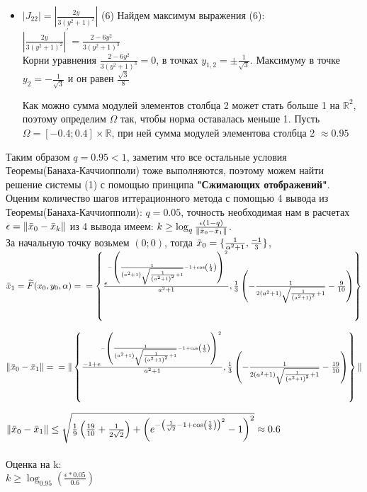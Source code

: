 \documentclass[a4paper, fontsize=14pt]{article}
\begin{document}
\begin{itemize}
        \item $|J_{22}| = |\frac{2 y}{3 \left(y^2+1\right)^2}|$ (6)
	Найдем максимум выражения (6):
	\\$|\frac{2 y}{3 \left(y^2+1\right)^2}|^\prime = \frac{2-6 y^2}{3 \left(y^2+1\right)^3}$
	\\Корни уравнения $\frac{2-6 y^2}{3 \left(y^2+1\right)^3} = 0$, в точках $y_{1,2} = \pm\frac{1}{\sqrt{3}}$.
	Максимуму в точке $y_2 = -\frac{1}{\sqrt{3}}$ и он равен $\frac{\sqrt{3}}{8}$

        Как можно сумма модулей элементов столбца 2 может стать больше 1 на $\mathbb{R}^2$, поэтому определим $\Omega$ так, чтобы норма оставалась меньше 1. Пусть $\Omega = [-0.4; 0.4]\times \mathbb{R}$, при ней сумма модулей элементова столбца 2 $\approx 0.95$
    \end{itemize}
    Таким образом $q = 0.95 < 1$, заметим что все остальные условия Теоремы(Банаха-Каччиопполи) тоже выполняются, поэтому можем найти решение системы (1) с помощью принципа \textbf{"Сжимающих отображений"}.
    \\
    Оценим количество шагов иттерационного метода с помощью 4 вывода из \\
    Теоремы(Банаха-Каччиопполи):
    $q = 0.05$, точность необходимая нам в расчетах $\epsilon = \Vert\Bar{x}_0 - \Bar{x}_k\Vert$
    из 4 вывода имеем: $k \geq \log_q \frac{\epsilon(1-q)}{\Vert\Bar{x}_0 - \Bar{x}_1\Vert}$.
    \\За начальную точку возьмем $(0;0)$, тогда $\Bar{x}_0 = \{\frac{1}{\alpha^2 + 1}, \frac{-1}{3} \}$, $\Bar{x}_1 = \widetilde{F}(x_0, y_0, \alpha) =
    \\ = \left\{ \frac{e^{ -\left(\frac{1}{\left(a^2+1\right) \sqrt{\frac{1}{\left(a^2+1\right)^2}+1}}-1+\cos \left(\frac{1}{3}\right)\right)^2}}{a^2+1}, \frac{1}{3} \left(-\frac{1}{2 \left(a^2+1\right) \sqrt{\frac{1}{\left(a^2+1\right)^2}+1}}-\frac{9}{10}\right)\right\}$

    $ \Vert\Bar{x}_0 - \Bar{x}_1\Vert =
    \\\\ = \Vert\left\{\frac{-1 + e^{ -\left(\frac{1}{\left(a^2+1\right) \sqrt{\frac{1}{\left(a^2+1\right)^2}+1}}-1+\cos \left(\frac{1}{3}\right)\right)^2}}{a^2+1} , \frac{1}{3} \left(-\frac{1}{2 \left(a^2+1\right) \sqrt{\frac{1}{\left(a^2+1\right)^2}+1}}-\frac{19}{10}\right) \right\} \Vert$

    $\Vert\Bar{x}_0 - \Bar{x}_1\Vert \leq \sqrt{\frac{1}{9} \left(\frac{19}{10}+\frac{1}{2 \sqrt{2}}\right)+\left(e^{-\left(\frac{1}{\sqrt{2}}-1+\cos \left(\frac{1}{3}\right)\right)^2}-1\right)^2} \approx 0.6$
    \\\\Оценка на k:
    \\$k \geq \log_{0.95} (\frac{\epsilon * 0.05}{0.6})$
\end{document}
